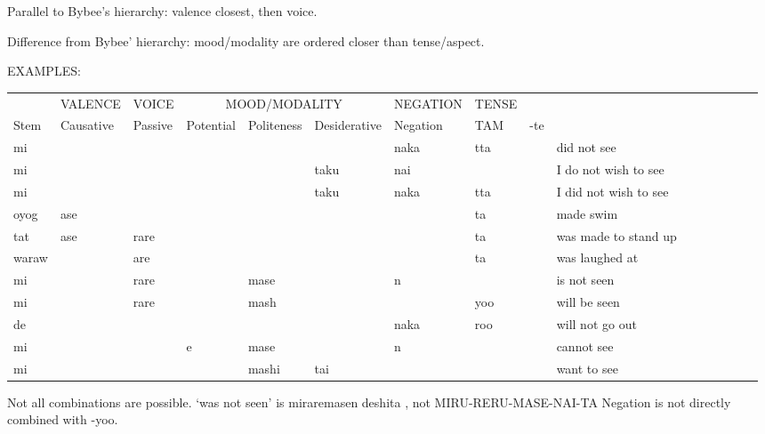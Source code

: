 Parallel to Bybee's hierarchy: valence closest, then voice.

Difference from Bybee' hierarchy: mood/modality are ordered closer than tense/aspect.

EXAMPLES:

\begin{tabular}{lllllllll|lllllll}
     & VALENCE   & VOICE    & \multicolumn{3}{c}{MOOD/MODALITY} & NEGATION & TENSE \\
Stem & Causative & Passive & Potential & Politeness & Desiderative & Negation & TAM & -te & \\ \hline
mi &          &      & &            &          & naka     & tta &    & did not see \cite[153]{vaccari1938complete}\\
mi &          &      & &            & taku     & nai      &     &     & I do not wish to see \cite[98]{vaccari1938complete} \\
mi &          &      & &            & taku     & naka    & tta  &      & I did not wish to see \cite[98]{vaccari1938complete} \\
oyog & ase    &      & &            &          &         & ta    &     & made swim \\
tat & ase     & rare & &            &          &         & ta    &     & was made to stand up \cite[396]{kaiser2013japanese} \\
waraw  &       & are & &            &           &         & ta    &    & was laughed at \cite[384]{kaiser2013japanese} \\
mi     &       & rare& & mase       &          & n        &      &     & is not seen \cite[337]{vaccari1938complete} \\
mi     &       & rare& & mash      &           &          & yoo  &    & will be seen \cite[337]{vaccari1938complete} \\
de     &       &    & &            &           & naka     & roo  &    & will not go out \cite[170]{vaccari1938complete} \\
mi     &       &    & e & mase       &           & n        &      &    & cannot see \cite[349]{vaccari1938complete} \\
mi     &       &    & & mashi      & tai       &          &      &    & want to see
\end{tabular}


Not all combinations are possible. 
`was not seen' is miraremasen deshita \cite[337]{vaccari1938complete}, not MIRU-RERU-MASE-NAI-TA
Negation is not directly combined with -yoo.

